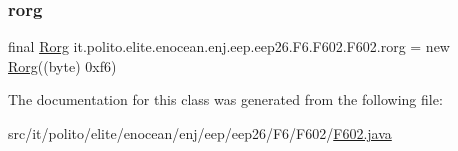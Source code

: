 \subsubsection{\texorpdfstring{rorg}{rorg}}
{\footnotesize\ttfamily final \hyperlink{classit_1_1polito_1_1elite_1_1enocean_1_1enj_1_1eep_1_1_rorg}{Rorg} it.\+polito.\+elite.\+enocean.\+enj.\+eep.\+eep26.\+F6.\+F602.\+F602.\+rorg = new \hyperlink{classit_1_1polito_1_1elite_1_1enocean_1_1enj_1_1eep_1_1_rorg}{Rorg}((byte) 0xf6)\hspace{0.3cm}{\ttfamily [static]}}



The documentation for this class was generated from the following file\+:\begin{DoxyCompactItemize}
\item 
src/it/polito/elite/enocean/enj/eep/eep26/\+F6/\+F602/\hyperlink{_f602_8java}{F602.\+java}\end{DoxyCompactItemize}

